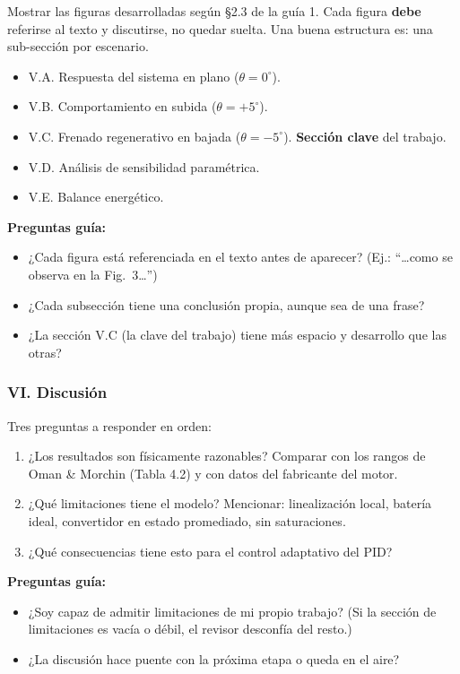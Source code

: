 \documentclass[11pt,a4paper]{article}
\begin{document}
Mostrar las figuras desarrolladas según §2.3 de la guía 1. Cada figura \textbf{debe} referirse al texto y discutirse, no quedar suelta. Una buena estructura es: una sub-sección por escenario.

\begin{itemize}
    \item V.A. Respuesta del sistema en plano ($\theta = 0^\circ$).
    \item V.B. Comportamiento en subida ($\theta = +5^\circ$).
    \item V.C. Frenado regenerativo en bajada ($\theta = -5^\circ$). \textbf{Sección clave} del trabajo.
    \item V.D. Análisis de sensibilidad paramétrica.
    \item V.E. Balance energético.
\end{itemize}

\begin{guia}
\textbf{Preguntas guía:}
\begin{itemize}
    \item ¿Cada figura está referenciada en el texto antes de aparecer? (Ej.: ``\dots como se observa en la Fig.~3\dots'')
    \item ¿Cada subsección tiene una conclusión propia, aunque sea de una frase?
    \item ¿La sección V.C (la clave del trabajo) tiene más espacio y desarrollo que las otras?
\end{itemize}
\end{guia}

\subsubsection{VI. Discusión}

Tres preguntas a responder en orden:

\begin{enumerate}
    \item ¿Los resultados son físicamente razonables? Comparar con los rangos de Oman \& Morchin (Tabla 4.2) y con datos del fabricante del motor.
    \item ¿Qué limitaciones tiene el modelo? Mencionar: linealización local, batería ideal, convertidor en estado promediado, sin saturaciones.
    \item ¿Qué consecuencias tiene esto para el control adaptativo del PID?
\end{enumerate}

\begin{guia}
\textbf{Preguntas guía:}
\begin{itemize}
    \item ¿Soy capaz de admitir limitaciones de mi propio trabajo? (Si la sección de limitaciones es vacía o débil, el revisor desconfía del resto.)
    \item ¿La discusión hace puente con la próxima etapa o queda en el aire?
\end{itemize}
\end{guia}
\end{document}
